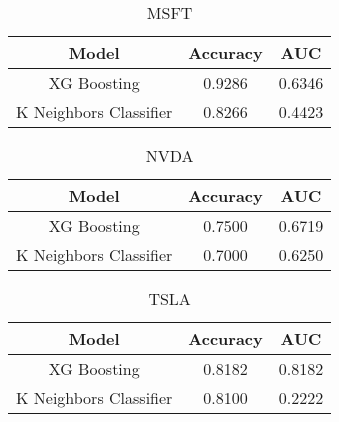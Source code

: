 \documentclass{article}
\begin{document}
\begin{table}[h]
\centering
\begin{tabular}{ccc}
\hline
\textbf{Model} & \textbf{Accuracy} & \textbf{AUC} \\ \hline
XG Boosting & 0.9286  & 0.6346 \\
K Neighbors Classifier & 0.8266 & 0.4423 \\ \hline
\end{tabular}
\caption{MSFT}
\end{table}
\begin{table}[h]
\centering
\begin{tabular}{ccc}
\hline
\textbf{Model} & \textbf{Accuracy} & \textbf{AUC} \\ \hline
XG Boosting & 0.7500  & 0.6719	 \\
K Neighbors Classifier & 0.7000 & 0.6250 \\ \hline
\end{tabular}
\caption{NVDA}
\end{table}
\begin{table}[h]
\centering
\begin{tabular}{ccc}
\hline
\textbf{Model} & \textbf{Accuracy} & \textbf{AUC} \\ \hline
XG Boosting & 0.8182  & 0.8182	 \\
K Neighbors Classifier & 0.8100 & 0.2222 \\ \hline
\end{tabular}
\caption{TSLA}
\end{table}
\end{document}
